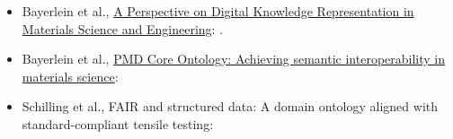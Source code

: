 \begin{itemize}
    \item Bayerlein et al., \href{https://doi.org/10.1002/adem.202101176}{A Perspective on Digital Knowledge Representation in Materials Science and Engineering}: \cite{BayerleinPerspective2022}.
    \item Bayerlein et al., \href{https://doi.org/10.1016/j.matdes.2023.112603}{PMD Core Ontology: Achieving semantic interoperability in materials science}: \cite{BayerleinPMDco2024}
    \item Schilling et al., FAIR and structured data: A domain ontology aligned with standard-compliant tensile testing: \cite{SchillingTTO2023}
\end{itemize}

\newpage
